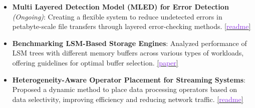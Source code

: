 \documentclass[10pt,a4paper,calibri]{moderncv}
\begin{document}
\begin{itemize}
	\item \textbf{Multi Layered Detection Model (MLED) for Error Detection} \textit{(Ongoing)}: Creating a flexible system to reduce undetected errors in petabyte-scale file transfers through layered error-checking methods.
	      \href{https://github.com/shubham-sudo/mled}{[\textcolor{blueviolet}{readme}]}

	\item \textbf{Benchmarking LSM-Based Storage Engines}: Analyzed performance of LSM trees with different memory buffers across various types of workloads, offering guidelines for optimal buffer selection.
	      \href{https://shubhamkaushik.com/assets/pdf/LSMMemory.pdf}{[\textcolor{blueviolet}{paper}]}

	\item \textbf{Heterogeneity-Aware Operator Placement for Streaming Systems}: Proposed a dynamic method to place data processing operators based on data selectivity, improving efficiency and reducing network traffic.
	      \href{https://github.com/shubham-sudo/HeterogeneityAwareOperatorPlacementforStreamProcessingSystemsAtEdge-RaspberryPi}{[\textcolor{blueviolet}{readme}]}


\end{itemize}
\end{document}
